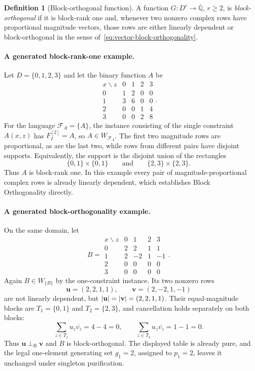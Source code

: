 \documentclass[11pt]{article}
\theoremstyle{plain}
\theoremstyle{definition}
\newtheorem{definition}[definition]{Definition}
\theoremstyle{remark}
\newcommand{\AlgNums}{\overline{\mathbb Q}}
\newcommand{\cF}{\mathcal F}
\DeclarePairedDelimiter{\abs}{\lvert}{\rvert}
\begin{document}
\begin{definition}[Block-orthogonal function]
\label{def:block-orthogonal-function}
A function $G:D^r\to\AlgNums$, $r\ge2$, is \emph{block-orthogonal} if it
is block-rank one and, whenever two nonzero complex rows have proportional
magnitude vectors, those rows are either linearly dependent or
block-orthogonal in the sense of~\eqref{eq:vector-block-orthogonality}.
\end{definition}

\paragraph{A generated block-rank-one example.}
Let $D=\{0,1,2,3\}$ and let the binary function $A$ be
\[
\begin{array}{c|rrrr}
  x\backslash z&0&1&2&3\\ \hline
  0&1&2&0&0\\
  1&3&6&0&0\\
  2&0&0&1&4\\
  3&0&0&2&8
\end{array}.
\]
For the language $\cF_A=\{A\}$, the instance consisting of the single
constraint $A(x,z)$ has $F_I^{[2]}=A$, so $A\in W_{\cF_A}$.  The first two
magnitude rows are proportional, as are the last two, while rows from
different pairs have disjoint supports.  Equivalently, the support is the
disjoint union of the rectangles
\[
  \{0,1\}\times\{0,1\}
  \qquad\text{and}\qquad
  \{2,3\}\times\{2,3\}.
\]
Thus $A$ is block-rank one.  In this example every pair of
magnitude-proportional complex rows is already linearly dependent, which
establishes Block Orthogonality directly.

\paragraph{A generated block-orthogonality example.}
On the same domain, let
\[
B=
\begin{array}{c|rrrr}
  x\backslash z&0&1&2&3\\ \hline
  0&2&2&1&1\\
  1&2&-2&1&-1\\
  2&0&0&0&0\\
  3&0&0&0&0
\end{array}.
\]
Again $B\in W_{\{B\}}$ by the one-constraint instance.  Its two nonzero
rows
\[
  \mathbf u=(2,2,1,1),\qquad
  \mathbf v=(2,-2,1,-1)
\]
are not linearly dependent, but
$\abs{\mathbf u}=\abs{\mathbf v}=(2,2,1,1)$.  Their equal-magnitude blocks
are $T_1=\{0,1\}$ and $T_2=\{2,3\}$, and cancellation holds separately on
both blocks:
\[
  \sum_{z\in T_1}u_z\overline{v_z}=4-4=0,
  \qquad
  \sum_{z\in T_2}u_z\overline{v_z}=1-1=0.
\]
Thus $\mathbf u\perp_{\mathrm B}\mathbf v$ and $B$ is block-orthogonal.
The displayed table is already pure, and the legal one-element generating
set $g_1=2$, assigned to $p_1=2$, leaves it unchanged under singleton
purification.
\end{document}
